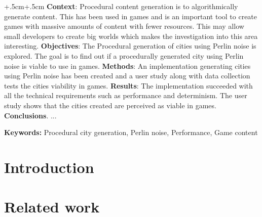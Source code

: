 \documentclass[a4paper,oneside]{bth}
\begin{document}
\abstract
\begin{changemargin}{+.5cm}{+.5cm}
\noindent
\textbf{Context}: Procedural content generation is to algorithmically generate content. This has been used in games and is an important tool to create games with massive amounts of content with fewer resources. This may allow small developers to create big worlds which makes the investigation into this area interesting.\newline
\textbf{Objectives}: The Procedural generation of cities using Perlin noise is explored. The goal is to find out if a procedurally generated city using Perlin noise is viable to use in games. \newline
\textbf{Methods}: An implementation generating cities using Perlin noise has been created and a user study along with data collection tests the cities viability in games.\newline
\textbf{Results}: The implementation succeeded with all the technical requirements such as performance and determinism. The user study shows that the cities created are perceived as viable in games. \newline
\textbf{Conclusions}. ...

\vspace {1cm}
\noindent
\textbf{Keywords:} Procedural city generation, Perlin noise, Performance, Game content

\end{changemargin}


\tableofcontents

\cleardoublepage
\pagestyle{headings}


\chapter{Introduction}


\chapter{Related work}

\end{document}

